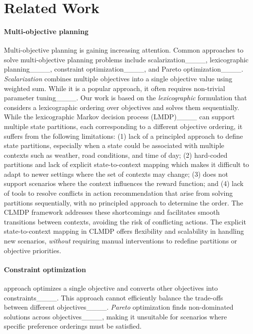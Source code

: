 \section{Related Work}
\paragraph{Multi-objective planning} Multi-objective planning is gaining increasing attention. Common approaches to solve multi-objective planning problems include scalarization____, lexicographic planning____, constraint optimization____, and Pareto optimization____. \emph{Scalarization} combines multiple objectives into a single objective value using weighted sum. While it is a popular approach, it often requires non-trivial parameter tuning____. Our work is based on the \emph{lexicographic} formulation that considers a lexicographic ordering over objectives and solves them sequentially.
While the lexicographic Markov decision process (LMDP)____ can support multiple state partitions, each corresponding to a different objective ordering, it suffers from the following limitations: (1) lack of a principled approach to define state partitions, especially when a state could be associated with multiple contexts such as weather, road conditions, and time of day; (2) hard-coded partitions and lack of explicit state-to-context mapping which makes it difficult to adapt to newer settings where the set of contexts may change; (3) does not support scenarios where the context influences the reward function; and (4) lack of tools to resolve conflicts in action recommendation that arise from solving partitions sequentially, with no principled approach to determine the order. 
The CLMDP framework addresses these shortcomings and facilitates smooth transitions between contexts, avoiding the risk of conflicting actions. The explicit state-to-context mapping in CLMDP offers flexibility and scalability in handling new scenarios, \emph{without} requiring manual interventions to redefine partitions or objective priorities. 

\paragraph{Constraint optimization} approach optimizes a single objective and converts other objectives into constraints____. This approach cannot efficiently balance the trade-offs between different objectives____.
\emph{Pareto} optimization finds non-dominated solutions across objectives____, making it unsuitable for scenarios where specific preference orderings must be satisfied.

